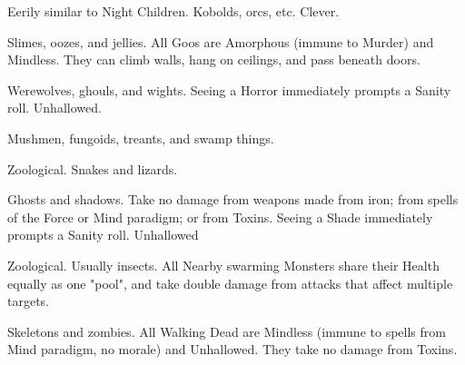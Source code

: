 {\begin{multicols}{2}
{    \item {}  Eerily similar to Night Children.  Kobolds, orcs, etc.  Clever.
    \item {}  Slimes, oozes, and jellies. All Goos are Amorphous (immune to Murder) and Mindless. They can climb walls, hang on ceilings, and pass beneath doors.
    \item {}  Werewolves, ghouls, and wights.  Seeing a Horror immediately prompts a Sanity roll. Unhallowed.
    \item {}  Mushmen, fungoids, treants, and swamp things.
    \item {}  Zoological.  Snakes and lizards.
    \item {}  Ghosts and shadows. Take no damage from weapons made from iron; from spells of the Force or Mind paradigm; or from Toxins. Seeing a Shade immediately prompts a Sanity roll.  Unhallowed
    \item {}  Zoological.  Usually insects.  All Nearby swarming Monsters share their Health equally as one "pool", and take double damage from attacks that affect multiple targets.
    \item {}  Skeletons and zombies. All Walking Dead are Mindless (immune to spells from Mind paradigm, no morale) and Unhallowed. They take no damage from Toxins.
}


  \newpage









\end{multicols}}
